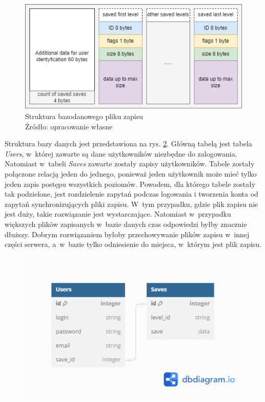 \documentclass[12pt, a4paper]{article} %
\begin{document}
\begin{figure}[h]
	\centering
	\includegraphics[width=12cm]{images/database_save_file.png}
	\caption{Struktura bazodanowego pliku zapisu \\ Źródło: opracowanie własne}
	\label{rys:bazodanowy_plik_zapisu}
\end{figure} 

\aka Struktura bazy danych jest przedstawiona na rys. \ref{rys:struktura_bazy_danych}. Główną tabelą jest tabela \textit{Users}, w~której zawarte są dane użytkowników niezbędne do zalogowania. Natomiast w~tabeli \textit{Saves} zawarte zostały zapisy użytkowników. Tabele zostały połączone relacją jeden do jednego, ponieważ jeden użytkownik może mieć tylko jeden zapis postępu wszystkich poziomów. Powodem, dla którego tabele zostały tak podzielone, jest rozdzielenie zapytań podczas logowania i tworzenia konta od zapytań synchronizujących pliki zapisu. W~tym przypadku, gdzie plik zapisu nie jest duży, takie rozwiązanie jest wystarczające. Natomiast w~przypadku większych plików zapisanych w~bazie danych czas odpowiedzi byłby znacznie dłuższy. Dobrym rozwiązaniem byłoby przechowywanie plików zapisu w~innej części serwera, a~w~bazie tylko odniesienie do miejsca, w~którym jest plik zapisu.

\begin{figure}[h]
	\centering
	\includegraphics[width=12cm]{images/db_structure.png}
	\caption{}
	\label{rys:struktura_bazy_danych}
\end{figure} 
\end{document}
